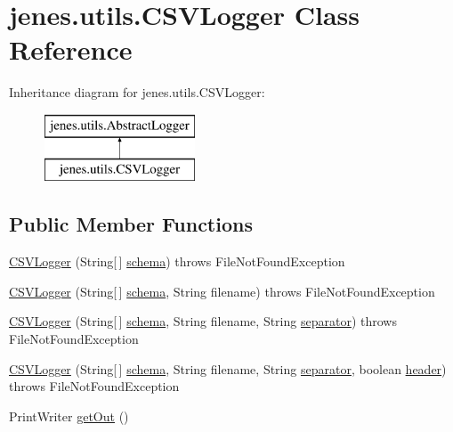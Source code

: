 \hypertarget{classjenes_1_1utils_1_1_c_s_v_logger}{\section{jenes.\-utils.\-C\-S\-V\-Logger Class Reference}
\label{classjenes_1_1utils_1_1_c_s_v_logger}
}
Inheritance diagram for jenes.\-utils.\-C\-S\-V\-Logger\-:\begin{figure}[H]
\begin{center}
\leavevmode
\includegraphics[height=2.000000cm]{classjenes_1_1utils_1_1_c_s_v_logger}
\end{center}
\end{figure}
\subsection*{Public Member Functions}
\begin{DoxyCompactItemize}
\item 
\hyperlink{classjenes_1_1utils_1_1_c_s_v_logger_a8cac9e217f74d86b4e26b025d8e1381c}{C\-S\-V\-Logger} (String\mbox{[}$\,$\mbox{]} \hyperlink{classjenes_1_1utils_1_1_abstract_logger_a3a2030876857a0512fae7e0ad400c570}{schema})  throws File\-Not\-Found\-Exception 
\item 
\hyperlink{classjenes_1_1utils_1_1_c_s_v_logger_a52ccc76492a8a16e018198bcfa702360}{C\-S\-V\-Logger} (String\mbox{[}$\,$\mbox{]} \hyperlink{classjenes_1_1utils_1_1_abstract_logger_a3a2030876857a0512fae7e0ad400c570}{schema}, String filename)  throws File\-Not\-Found\-Exception 
\item 
\hyperlink{classjenes_1_1utils_1_1_c_s_v_logger_ad6242d77cf75372bfbf55e9b0973bfb4}{C\-S\-V\-Logger} (String\mbox{[}$\,$\mbox{]} \hyperlink{classjenes_1_1utils_1_1_abstract_logger_a3a2030876857a0512fae7e0ad400c570}{schema}, String filename, String \hyperlink{classjenes_1_1utils_1_1_c_s_v_logger_ab776f8518f5adaad782861e258ca494a}{separator})  throws File\-Not\-Found\-Exception 
\item 
\hyperlink{classjenes_1_1utils_1_1_c_s_v_logger_ad39241223c9d49bfa34a21db4aa1f8b1}{C\-S\-V\-Logger} (String\mbox{[}$\,$\mbox{]} \hyperlink{classjenes_1_1utils_1_1_abstract_logger_a3a2030876857a0512fae7e0ad400c570}{schema}, String filename, String \hyperlink{classjenes_1_1utils_1_1_c_s_v_logger_ab776f8518f5adaad782861e258ca494a}{separator}, boolean \hyperlink{classjenes_1_1utils_1_1_c_s_v_logger_a37a4fd771c2013343778dd982244c2db}{header})  throws File\-Not\-Found\-Exception 
\item 
Print\-Writer \hyperlink{classjenes_1_1utils_1_1_c_s_v_logger_a00671f9154ae65398d676e6526fa08f2}{get\-Out} ()
\end{DoxyCompactItemize}

